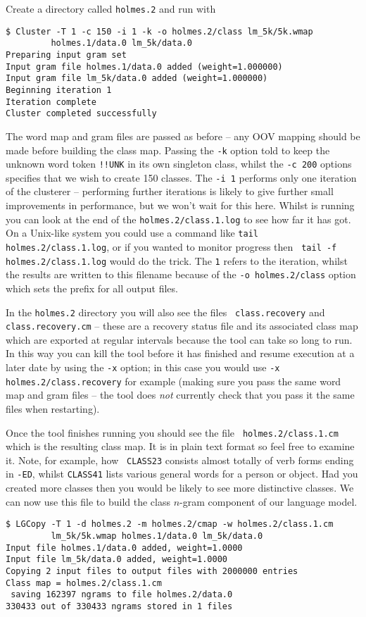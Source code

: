 Create a directory called {\tt holmes.2} and run  with
\begin{verbatim}
$ Cluster -T 1 -c 150 -i 1 -k -o holmes.2/class lm_5k/5k.wmap
         holmes.1/data.0 lm_5k/data.0
Preparing input gram set
Input gram file holmes.1/data.0 added (weight=1.000000)
Input gram file lm_5k/data.0 added (weight=1.000000)
Beginning iteration 1
Iteration complete
Cluster completed successfully
\end{verbatim} %
The word map and gram files are passed as before -- any OOV mapping
should be made before building the class map.  Passing the {\tt -k}
option told  to keep the unknown word token {\tt !!UNK}
in its own singleton class, whilst the {\tt -c 200} options specifies
that we wish to create 150 classes.  The {\tt -i 1} performs only one
iteration of the clusterer -- performing further iterations is likely
to give further small improvements in performance, but we won't wait
for this here.  Whilst  is running you can look at the
end of the {\tt holmes.2/class.1.log} to see how far it has got.  On a
Unix-like system you could use a command like {\tt tail
holmes.2/class.1.log}, or if you wanted to monitor progress then {\tt
tail -f holmes.2/class.1.log} would do the trick.  The {\tt 1} refers
to the iteration, whilst the results are written to this filename
because of the {\tt -o holmes.2/class} option which sets the prefix
for all output files.

In the {\tt holmes.2} directory you will also see the files {\tt
class.recovery} and {\tt class.recovery.cm} -- these are a recovery
status file and its associated class map which are exported at regular
intervals because the  tool can take so long to run.
In this way you can kill the tool before it has finished and resume
execution at a later date by using the {\tt -x} option; in this case
you would use {\tt -x holmes.2/class.recovery} for example (making
sure you pass the same word map and gram files -- the tool does
{\it not} currently check that you pass it the same files when restarting).

Once the tool finishes running you should see the file {\tt
holmes.2/class.1.cm} which is the resulting class map.  It is in plain
text format so feel free to examine it.  Note, for example, how {\tt
CLASS23} consists almost totally of verb forms ending in {\tt -ED},
whilst {\tt CLASS41} lists various general words for a person or
object.  Had you created more classes then you would be likely to see
more distinctive classes.  We can now use this file to build the class
$n$-gram component of our language model.
\begin{verbatim}
$ LGCopy -T 1 -d holmes.2 -m holmes.2/cmap -w holmes.2/class.1.cm
         lm_5k/5k.wmap holmes.1/data.0 lm_5k/data.0
Input file holmes.1/data.0 added, weight=1.0000
Input file lm_5k/data.0 added, weight=1.0000
Copying 2 input files to output files with 2000000 entries
Class map = holmes.2/class.1.cm
 saving 162397 ngrams to file holmes.2/data.0 
330433 out of 330433 ngrams stored in 1 files
\end{verbatim} %


